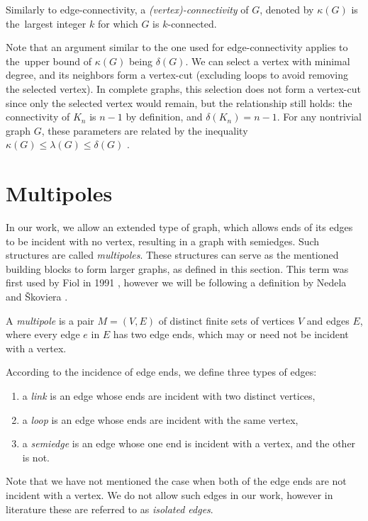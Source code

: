 \documentclass[12pt, twoside]{book}
\begin{document}
Similarly to edge-connectivity, a \textit{(vertex)-connectivity} of $G$, denoted by $\kappa(G)$ is the~largest integer $k$ for which $G$ is $k$-connected.

Note that an argument similar to the one used for edge-connectivity applies to the~upper bound of $\kappa(G)$ being $\delta(G)$. We can select a vertex with minimal degree, and its neighbors form a vertex-cut (excluding loops to avoid removing the selected vertex). In complete graphs, this selection does not form a vertex-cut since only the selected vertex would remain, but the relationship still holds: the connectivity of $K_n$ is $n-1$ by definition, and $\delta(K_n)=n-1$. For any nontrivial graph $G$, these parameters are related by the inequality $\kappa(G)\leq \lambda(G) \leq \delta(G)$ \cite{Diestel}.

\section{Multipoles}\label{sec:multipoles}

In our work, we allow an extended type of graph, which allows ends of its edges to be incident with no vertex, resulting in a graph with semiedges. Such structures are called \textit{multipoles}. These structures can serve as the mentioned building blocks to form larger graphs, as defined in this section. This term was first used by Fiol in 1991 \cite{Fiol1991}, however we will be following a definition by Nedela and Škoviera \cite{Nedela1996}.

\begin{definition}
	A \textit{multipole} is a pair $M=(V,E)$ of distinct finite sets of vertices $V$ and edges $E$, where every edge $e$ in $E$ has two edge ends, which may or need not be incident with a vertex.
	
	According to the incidence of edge ends, we define three types of edges:
	\begin{enumerate}[nolistsep]
		\item a \textit{link} is an edge whose ends are incident with two distinct vertices,
		\item a \textit{loop} is an edge whose ends are incident with the same vertex,
		\item a \textit{semiedge} is an edge whose one end is incident with a vertex, and the other is not.
	\end{enumerate}
\end{definition}

Note that we have not mentioned the case when both of the edge ends are not incident with a vertex. We do not allow such edges in our work, however in literature these are referred to as \textit{isolated edges}.
\end{document}
